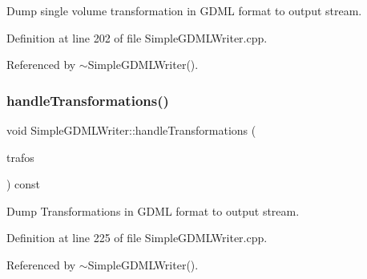 Dump single volume transformation in G\+D\+ML format to output stream. 



Definition at line 202 of file Simple\+G\+D\+M\+L\+Writer.\+cpp.



Referenced by $\sim$\+Simple\+G\+D\+M\+L\+Writer().

\hypertarget{class_d_d4hep_1_1_geometry_1_1_simple_g_d_m_l_writer_ad664ba2864513899c1e6a9fe4aa5e8c1}{}\label{class_d_d4hep_1_1_geometry_1_1_simple_g_d_m_l_writer_ad664ba2864513899c1e6a9fe4aa5e8c1} 
\subsubsection{\texorpdfstring{handle\+Transformations()}{handleTransformations()}}
{\footnotesize\ttfamily void Simple\+G\+D\+M\+L\+Writer\+::handle\+Transformations (\begin{DoxyParamCaption}\item[{const \hyperlink{class_d_d4hep_1_1_geometry_1_1_geo_handler_types_aa52b3113e87db04c37666e85a9b5e569}{Transform\+Set} \&}]{trafos }\end{DoxyParamCaption}) const\hspace{0.3cm}{\ttfamily [virtual]}}



Dump Transformations in G\+D\+ML format to output stream. 



Definition at line 225 of file Simple\+G\+D\+M\+L\+Writer.\+cpp.



Referenced by $\sim$\+Simple\+G\+D\+M\+L\+Writer().

\hypertarget{class_d_d4hep_1_1_geometry_1_1_simple_g_d_m_l_writer_a0455532c28daf3d1ffca21f96f4007e1}{}\label{class_d_d4hep_1_1_geometry_1_1_simple_g_d_m_l_writer_a0455532c28daf3d1ffca21f96f4007e1} 

